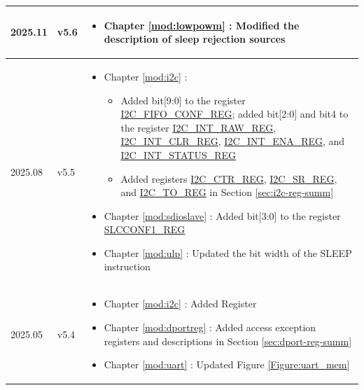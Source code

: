 \begin{longtable}[l]{ | m{2cm} | m{1.5cm} | m{12cm} | }
2025.11 & v5.6 &
\vspace{0.5em}
\begin{itemize}
    \item Chapter \ref{mod:lowpowm} \textit{\nameref{mod:lowpowm}}: Modified the description of sleep rejection sources
\end{itemize}
\vspace{-1em}
\\\hline

2025.08 & v5.5 &
\vspace{0.5em}
 \begin{itemize}
    \item Chapter \ref{mod:i2c} \textit{\nameref{mod:i2c}}:
        \begin{itemize}
            \item Added bit[9:0] to the register \hyperref [regdesc:I2CFIFOCONFREG]{I2C\_FIFO\_CONF\_REG}; added bit[2:0] and bit4 to the register \hyperref [regdesc:I2CINTRAWREG]{I2C\_INT\_RAW\_REG}, \hyperref [regdesc:I2CINTCLRREG]{I2C\_INT\_CLR\_REG}, \hyperref [regdesc:I2CINTENAREG]{I2C\_INT\_ENA\_REG}, and \hyperref [regdesc:I2CINTSTATUSREG]{I2C\_INT\_STATUS\_REG}
            \item Added registers \hyperref[regdesc:I2CCTRREG]{I2C\_CTR\_REG}, \hyperref[regdesc:I2CSRREG]{I2C\_SR\_REG}, and \hyperref[regdesc:I2CTOREG]{I2C\_TO\_REG} in Section \ref{sec:i2c-reg-summ} \textit{\nameref{sec:i2c-reg-summ}}
        \end{itemize}
    \item Chapter \ref{mod:sdioslave} \textit{\nameref{mod:sdioslave}}: Added bit[3:0] to the register \hyperref[regdesc:SLCCONF1SLCCONF1REG]{SLCCONF1\_REG}
    \item Chapter \ref{mod:ulp} \textit{\nameref{mod:ulp}}: Updated the bit width of the SLEEP instruction
\end{itemize}
\vspace{-1em}
\\\hline

2025.05 & v5.4 &
\vspace{0.5em}
 \begin{itemize}
    \item Chapter \ref{mod:i2c} \textit{\nameref{mod:i2c}}:
Added Register
    \item Chapter \ref{mod:dportreg} \textit{\nameref{mod:dportreg}}: Added access exception registers and descriptions in Section \ref{sec:dport-reg-summ} \textit{\nameref{sec:dport-reg-summ}}
        \item Chapter \ref{mod:uart} \textit{\nameref{mod:uart}}: Updated Figure \ref{Figure:uart_mem} \textit{\nameref{Figure:uart_mem}}
\end{itemize}
\vspace{-1em}
\\\hline


\end{longtable}
